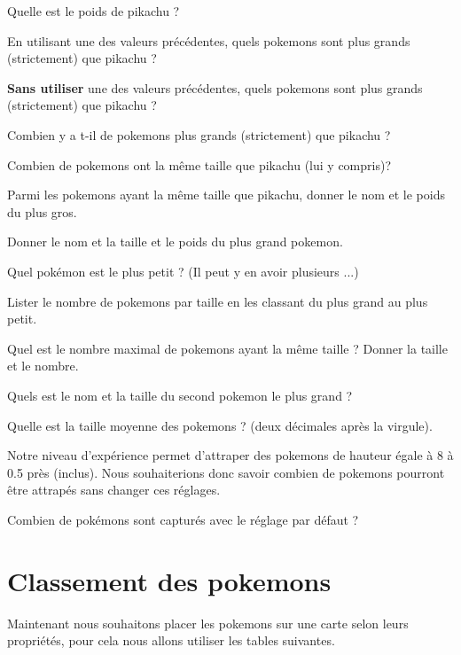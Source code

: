 \question{}
Quelle est le poids de pikachu ?

\question{}
En utilisant une des valeurs précédentes, quels pokemons sont plus grands (strictement) que pikachu ?

\question{}
\textbf{Sans utiliser} une des valeurs précédentes, quels pokemons sont plus grands (strictement) que pikachu ?

\question{}
Combien y a t-il de pokemons plus grands (strictement) que pikachu ?

\question{}
Combien de pokemons ont la même taille que pikachu (lui y compris)? 

\question{}
Parmi les pokemons ayant la même taille que pikachu, donner le nom et le poids du plus gros. 


\question{}
Donner le nom et la taille et le poids du plus grand pokemon. 


\question{}
Quel pokémon est le plus petit ? (Il peut y en avoir plusieurs ...)


\question{}
Lister le nombre de pokemons par taille en les classant du plus grand au plus petit. 

\question{}
Quel est le nombre maximal de pokemons ayant la même taille ? 
Donner la taille et le nombre.

\question{}
Quels est le nom et la taille du second pokemon le plus grand ? 

\question{}
Quelle est la taille moyenne des pokemons ? (deux décimales après la virgule).


Notre niveau d'expérience permet d'attraper des pokemons de hauteur égale à 8 à 0.5 près (inclus).
Nous souhaiterions donc savoir combien de pokemons pourront être attrapés sans changer ces réglages.

\question{}
 Combien de pokémons sont capturés avec le réglage par défaut ?

\section*{Classement des pokemons}
Maintenant nous souhaitons placer les pokemons sur une carte selon leurs propriétés, pour cela nous allons utiliser les tables suivantes.


